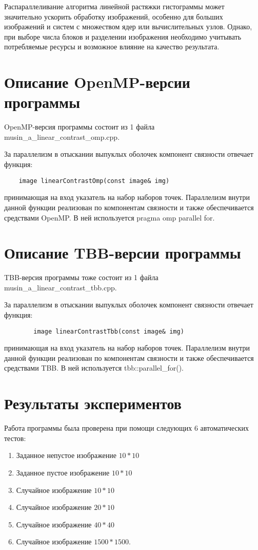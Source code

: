 \documentclass[14pt, russian]{extarticle}
\begin{document}
	Распараллеливание алгоритма линейной растяжки гистограммы может значительно ускорить обработку изображений, особенно для больших изображений и систем с множеством ядер или вычислительных узлов. Однако, при выборе числа блоков и разделении изображения необходимо учитывать потребляемые ресурсы и возможное влияние на качество результата.
	\newpage
	\section{Описание OpenMP-версии программы}
	
	OpenMP-версия программы состоит из 1 файла musin\_a\_linear\_contrast\_omp.cpp.
	
	За параллелизм в отыскании выпуклых оболочек компонент связности отвечает функция:
	\begin{lstlisting}
	image linearContrastOmp(const image& img)
	\end{lstlisting}
	 принимающая на вход указатель на набор наборов точек. Параллелизм внутри данной функции реализован по компонентам связности и также обеспечивается средствами OpenMP. В ней используется pragma omp parallel for.
	\newpage
	
	\section{Описание TBB-версии программы}
	TBB-версия программы тоже состоит из 1 файла musin\_a\_linear\_contrast\_tbb.cpp.
	
	За параллелизм в отыскании выпуклых оболочек компонент связности отвечает функция:
	\begin{lstlisting}
		image linearContrastTbb(const image& img)
	\end{lstlisting}
	принимающая на вход указатель на набор наборов точек. Параллелизм внутри данной функции реализован по компонентам связности и также обеспечивается средствами TBB. В ней используется tbb::parallel\_for().
	\newpage
	
	\section{Результаты экспериментов}
	Работа программы была проверена при помощи следующих 6 автоматических тестов:
	\begin{enumerate}[topsep=0pt, labelwidth=!, labelindent=0pt]
		\item Заданное непустое изображение $10 * 10$
		\item Заданное пустое изображение $10 * 10$
		\item Случайное изображение $ 10 * 10 $
		\item Случайное изображение $ 20 * 10 $
		\item Случайное изображение $ 40 * 40 $
		\item Случайное изображение $ 1500 * 1500 $.
	\end{enumerate}
	
\end{document}
